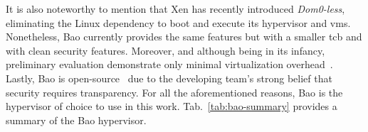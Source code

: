 It is also noteworthy to mention that Xen has recently introduced
\emph{Dom0-less}, eliminating the Linux dependency to boot and execute its
hypervisor and \glspl{vm}. Nonetheless, Bao currently provides the same
features but with a smaller \gls{tcb} and with clean security
features. Moreover, and although being in its infancy, preliminary evaluation
demonstrate only minimal virtualization overhead~\cite{martins_et_al:OASIcs:2020:11779}.
Lastly, Bao is open-source~\cite{baoRepo} due to the developing team's strong
belief that security requires transparency. For all the aforementioned reasons,
Bao is the hypervisor of choice to use in this work. Tab.~\ref{tab:bao-summary}
provides a summary of the Bao hypervisor.

